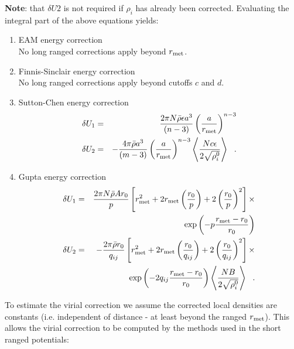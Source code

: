 {\bf Note}: that $\delta U{2}$ is not required if
$\rho_{i}$ has already been corrected.  Evaluating the
integral part of the above equations yields:
\begin{enumerate}
\item EAM energy correction \\
No long ranged corrections apply beyond $r_{\rm met}$.
\item Finnis-Sinclair energy correction \\
No long ranged corrections apply beyond cutoffs $c$ and $d$.
\item Sutton-Chen energy correction
\begin{eqnarray}
\delta U_{1} &=& \frac{2 \pi N \bar{\rho} \epsilon a^{3}}{(n-3)}
\left( \frac{a}{r_{\rm met}} \right)^{n-3} \nonumber \\
\delta U_{2} &=& -\frac{4 \pi \bar{\rho} a^{3}}{(m-3)} \left( \frac{a}{r_{\rm met}} \right)^{n-3}
\left< \frac{N c \epsilon}{2\sqrt{\rho_{i}^{0}}} \right>~~.
\end{eqnarray}
\item Gupta energy correction
\begin{eqnarray}
\delta U_{1} &=& \frac{2 \pi N \bar{\rho} A r_{0}}{p}
\left[ r_{\rm met}^{2} + 2 r_{\rm met} \left(\frac{r_{0}}{p}\right) +
2 \left(\frac{r_{0}}{p}\right)^{2} \right] \times \nonumber \\
& & \exp \left( -p \frac{r_{\rm met}-r_{0}}{r_{0}}\right) \nonumber \\
\delta U_{2} &=& -\frac{2 \pi \bar{\rho} r_{0}}{q_{ij}}
\left[ r_{\rm met}^{2} + 2 r_{\rm met} \left(\frac{r_{0}}{q_{ij}}\right) +
2 \left(\frac{r_{0}}{q_{ij}}\right)^{2} \right] \times \\
& & \exp \left( -2 q_{ij} \frac{r_{\rm met}-r_{0}}{r_{0}}\right)
\left< \frac{N B}{2\sqrt{\rho_{i}^{0}}} \right>~~. \nonumber
\end{eqnarray}
\end{enumerate}
To estimate the virial correction we assume the corrected local
densities are constants (i.e. independent of distance - at least
beyond the ranged $r_{\rm met}$).  This allows the virial correction to
be computed by the methods used in the short ranged potentials:
